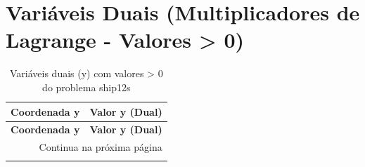\documentclass[12pt]{article}
\begin{document}
\section{Variáveis Duais (Multiplicadores de Lagrange - Valores > 0)}

\begin{longtable}{@{}cc@{}}
\caption{Variáveis duais (y) com valores > 0 do problema ship12s} \\
\toprule
\textbf{Coordenada y} & \textbf{Valor y (Dual)} \\
\midrule
\endfirsthead

\toprule
\textbf{Coordenada y} & \textbf{Valor y (Dual)} \\
\midrule
\endhead

\midrule \multicolumn{2}{r}{{Continua na próxima página}} \\ \midrule
\endfoot


\end{longtable}
\end{document}
